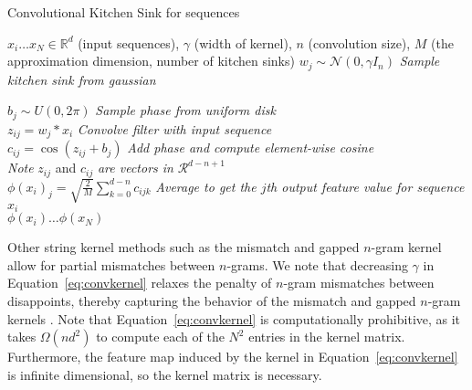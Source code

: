 \documentclass{article}
\begin{document}
\begin{algorithm}[b]
   \caption{Convolutional Kitchen Sink for sequences}\label{alg:cks}
   \begin{algorithmic}[1]
      \INPUT $x_{i} \ldots x_{N} \in \mathds{R}^{d}$ (input sequences), $\gamma$ (width of kernel),  $n$ (convolution size), $M$ (the approximation dimension, number of kitchen sinks)
         \STATE
         $w_{j} \sim \mathcal{N}(0, \gamma I_{n})$ \hspace*{2cm} \textit{Sample kitchen sink from gaussian}

         \STATE
         $b_{j} \sim U(0, 2\pi)$ \hspace*{2.28cm} \textit{Sample phase from uniform disk} \\

             \STATE
             $z_{ij} = w_{j} \ast x_{i}$ \hspace*{2.0cm} \textit{Convolve filter with input sequence} \label{cks:line5} \\
             \STATE
             $c_{ij} = \cos(z_{ij} + b_{j})$ \hspace*{1.3cm}\textit{Add phase and compute element-wise cosine} \\
            \hspace*{4.0cm} \textit{Note} $z_{ij}$ and $c_{ij}$ \textit{are vectors in } $\mathcal{R}^{d - n + 1}$ \label{cks:line5} \\

             \STATE $\phi(x_{i})_{j} = \sqrt{\frac{2}{M}} \displaystyle \sum_{k=0}^{d - n} c_{ijk} $ \hspace*{0.4cm} \textit{Average to get the $j$th output feature value for sequence $x_{i}$} \\
            \ENDFOR
     \ENDFOR
      \OUTPUT $\phi(x_{i}) \ldots \phi(x_{N})$
   \end{algorithmic}
\end{algorithm}

Other string kernel methods such as the mismatch \cite{eskin2002mismatch} and gapped $n$-gram kernel \cite{ghandi2014enhanced} allow for partial mismatches between $n$-grams. We note that decreasing $\gamma$ in Equation~\ref{eq:convkernel} relaxes the penalty of $n$-gram mismatches between disappoints, thereby capturing the behavior  of the mismatch and gapped $n$-gram kernels \cite{eskin2002mismatch, ghandi2014enhanced}. Note that Equation~\ref{eq:convkernel} is computationally prohibitive, as it takes $\Omega(nd^{2})$ to compute each of the $N^{2}$ entries in the kernel matrix.
Furthermore, the feature map induced by the kernel in Equation~\ref{eq:convkernel} is infinite dimensional, so the kernel matrix is necessary.
\end{document}
